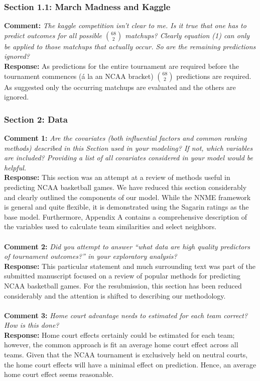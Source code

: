 \documentclass[11pt]{article} %
\begin{document}
\subsubsection*{Section 1.1: March Madness and Kaggle}
{\bf Comment:} \emph{The kaggle competition isn't clear to me. Is it true that one has to predict outcomes for all possible ${68 \choose 2}$ matchups? Clearly equation (1) can only be applied to those matchups that actually occur. So are the remaining predictions ignored?\\}
{\bf Response:} As predictions for the entire tournament are required before the tournament commences (\'a la an NCAA bracket) ${68 \choose 2}$ predictions are required. As suggested only the occurring matchups are evaluated and the others are ignored.  \\

\subsubsection*{Section 2: Data}
{\bf Comment 1:} \emph{Are the covariates (both influential factors and common ranking methods) described in this Section used in your modeling? If not, which variables are included? Providing a list of all covariates considered in your model would be helpful.\\}
{\bf Response:} This section was an attempt at a review of methods useful in predicting NCAA basketball games. We have reduced this section considerably and clearly outlined the components of our model. While the NNME framework is general and quite flexible, it is demonstrated using the Sagarin ratings as the base model. Furthermore, Appendix A contains a comprehensive description of the variables used to calculate team similarities and select neighbors.\\
\\
{\bf Comment 2:} \emph{Did you attempt to answer ``what data are high quality predictors of tournament outcomes?'' in your exploratory analysis?\\}
{\bf Response:} This particular statement and much surrounding text was part of the submitted manuscript focused on a review of popular methods for predicting NCAA basketball games. For the resubmission, this section has been reduced considerably and the attention is shifted to describing our methodology.\\
\\
{\bf Comment 3:} \emph{Home court advantage needs to estimated for each team correct? How is this done?\\}
{\bf Response:} Home court effects certainly could be estimated for each team; however, the common approach is fit an average home court effect across all teams. Given that the NCAA tournament is exclusively held on neutral courts, the home court effects will have a minimal effect on prediction. Hence, an average home court effect seems reasonable.\\
\end{document}
